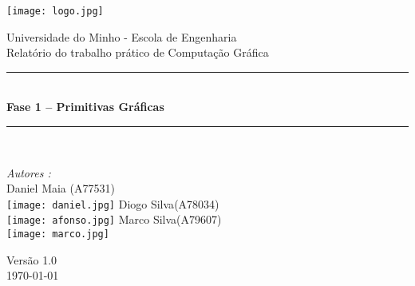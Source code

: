 \documentclass[a4paper]{article}
\begin{document}
\begin{titlepage}
\begin{center}


\texttt{[image: logo.jpg]}\\[0.5cm]

\vspace{10mm}

{\huge Universidade do Minho - Escola de Engenharia}\\[0.5cm]

{\large Relatório do trabalho prático de Computação Gráfica}\\[0.5cm]

\vspace{10mm} 

\rule{\linewidth}{0.5mm} \\[0.4cm]
{ \huge \bfseries Fase 1 – Primitivas Gráficas \\[0.4cm] }
\rule{\linewidth}{0.5mm} \\[1.5cm]

\noindent
\begin{minipage}{0.4\textwidth}
  \begin{flushleft} \large
    \emph{Autores :}\\
    Daniel Maia \textsc{(A77531)}\\
    \texttt{[image: daniel.jpg]}\break
    Diogo Silva\textsc{(A78034)}\\
    \texttt{[image: afonso.jpg]}\break
    Marco Silva\textsc{(A79607)}\\
    \texttt{[image: marco.jpg]}\break
  \end{flushleft}
\end{minipage}%
\vfill

{\large Versão 1.0 \\ \today}

\end{center}
\end{titlepage}


\begin{abstract}%

\hspace{3mm} O objetivo desta fase do trabalho prático é criar cenas hierárquicas em XML recorrendo a transformações geométricas. Uma cena é definida por uma árvore cujos nodos contêm um conjunto de transformações geométricas, nomeadamente, \textit{translate, rotate} e \textit{scale}, e, opcionalmente, um conjunto de modelos. Cada poderá ter também um ou mais filhos. 

\par Para demonstrar o resultado do trabalho nesta fase, definir-se-á também uma cena com o modelo estático do sistema solar, com o Sol, os planetas e luas, definidos numa hierarquia.

\end{abstract}
\end{document}
